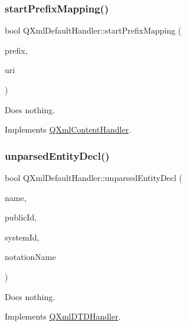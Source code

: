 \subsubsection{\texorpdfstring{startPrefixMapping()}{startPrefixMapping()}}
{\footnotesize\ttfamily bool Q\+Xml\+Default\+Handler\+::start\+Prefix\+Mapping (\begin{DoxyParamCaption}\item[{const \mbox{\hyperlink{class_q_string}{Q\+String}} \&}]{prefix,  }\item[{const \mbox{\hyperlink{class_q_string}{Q\+String}} \&}]{uri }\end{DoxyParamCaption})\hspace{0.3cm}{\ttfamily [virtual]}}

Does nothing. 

Implements \mbox{\hyperlink{class_q_xml_content_handler_acdf18588f1980d19d12efd025a5f5cc9}{Q\+Xml\+Content\+Handler}}.

\mbox{\label{class_q_xml_default_handler_ae4fe530e822e9d5d92a1c849c3f96488}} 
\subsubsection{\texorpdfstring{unparsedEntityDecl()}{unparsedEntityDecl()}}
{\footnotesize\ttfamily bool Q\+Xml\+Default\+Handler\+::unparsed\+Entity\+Decl (\begin{DoxyParamCaption}\item[{const \mbox{\hyperlink{class_q_string}{Q\+String}} \&}]{name,  }\item[{const \mbox{\hyperlink{class_q_string}{Q\+String}} \&}]{public\+Id,  }\item[{const \mbox{\hyperlink{class_q_string}{Q\+String}} \&}]{system\+Id,  }\item[{const \mbox{\hyperlink{class_q_string}{Q\+String}} \&}]{notation\+Name }\end{DoxyParamCaption})\hspace{0.3cm}{\ttfamily [virtual]}}

Does nothing. 

Implements \mbox{\hyperlink{class_q_xml_d_t_d_handler_a956c5143b8f349a19782fb56c577e04e}{Q\+Xml\+D\+T\+D\+Handler}}.

\mbox{\label{class_q_xml_default_handler_acaabb9885b0d301b151112ea3e05f361}} 
